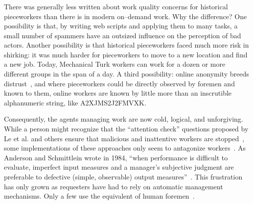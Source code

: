 \documentclass[pn4226]{subfiles}
\begin{document}
\subsubsection{\whatchanged}

\begin{comment}
	*workers make little money but love autonomy --- workers make little money
	workers blamed for quality --- ???
	both cases, sociality is hard
	*collective action hard --- collective action succeeded
	- algorithms, not managers
\end{comment}

There was generally less written about work quality concerns for historical pieceworkers than there is in modern on--demand work. 
Why the difference? 
One possibility is that, by writing web scripts and applying them to many tasks,
a small number of spammers have an outsized influence on the perception of bad actors.
Another possibility is that historical pieceworkers faced much more risk in shirking:
it was much harder for pieceworkers to move to a new location and find a new job.
Today, Mechanical Turk workers can work for a dozen or more different groups in the span of a day.
A third possibility: online anonymity breeds distrust~\cite{friedman2000trust}, and
where pieceworkers could be directly observed by foremen and known to them,
online workers are known by little more than an inscrutible alphanumeric string, like A2XJMS2J2FMVXK.



Consequently,
the agents managing work are now
cold, logical, and unforgiving.
While a person might recognize that the ``attention check'' questions
proposed by Le et al. and others ensure that
malicious and inattentive workers are stopped~\cite{le2010ensuring,AAAIW113995},
some implementations of these approaches
only seem to antagonize workers~\cite{takingAHITMcInnis}.
As Anderson and Schmittlein wrote in 1984,
``when performance is difficult to evaluate,
imperfect input measures and
a manager's subjective judgment are preferable to
defective (simple, observable) output measures''~\cite{10.2307/2555446}.
This frustration has only grown as requesters have had to rely on automatic management mechanisms.
Only a few use the equivalent of human foremen~\cite{haas2015argonaut,kulkarni2012mobileworks}.
\end{document}
